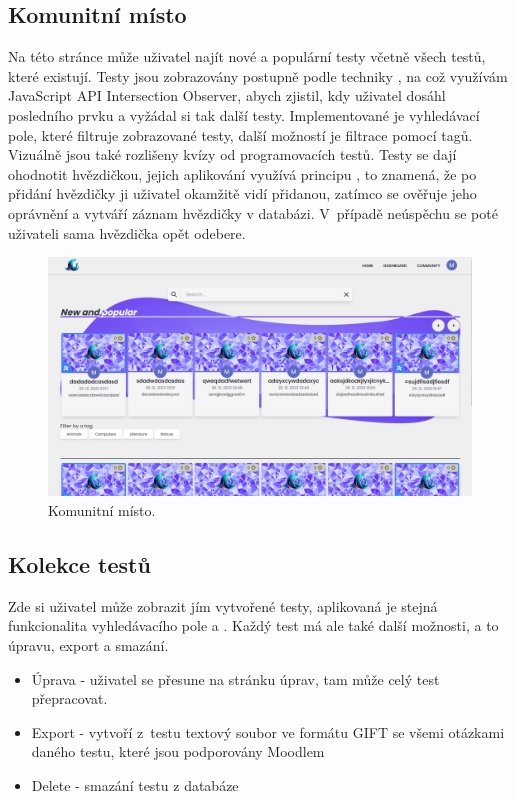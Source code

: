 \documentclass[12pt, a4paper,
openright
]{report}
\begin{document}
\subsection{Komunitní místo}
\label{subsec:community}
Na této stránce může uživatel najít nové a populární testy včetně všech testů, které existují. Testy jsou zobrazovány postupně podle techniky , na což využívám JavaScript API Intersection Observer, abych zjistil, kdy uživatel dosáhl posledního prvku a vyžádal si tak další testy. Implementované je vyhledávací pole, které filtruje zobrazované testy, další možností je filtrace pomocí tagů. Vizuálně jsou také rozlišeny kvízy od programovacích testů. Testy se dají ohodnotit hvězdičkou, jejich aplikování využívá principu , to znamená, že po přidání hvězdičky ji uživatel okamžitě vidí přidanou, zatímco se ověřuje jeho oprávnění a vytváří záznam hvězdičky v databázi. V~případě neúspěchu se poté uživateli sama hvězdička opět odebere. 

\begin{figure}[H]
	\centering %
	\includegraphics[width=1\linewidth]{image/community.png} 
	\caption{Komunitní místo.} %
	\label{fig:community} %
\end{figure}


\subsection{Kolekce testů}
\label{subsec:collection}
Zde si uživatel může zobrazit jím vytvořené testy, aplikovaná je stejná funkcionalita vyhledávacího pole a . Každý test má ale také další možnosti, a to úpravu, export a smazání.
\begin{itemize}
	\item Úprava - uživatel se přesune na stránku úprav, tam může celý test přepracovat.
	\item Export - vytvoří z~testu textový soubor ve formátu GIFT se všemi otázkami daného testu, které jsou podporovány Moodlem
	\item Delete - smazání testu z databáze
\end{itemize}
\end{document}
